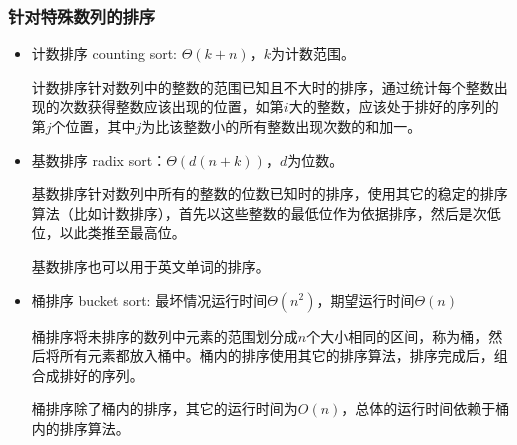 \subsubsection*{针对特殊数列的排序}
\begin{itemize}
    \item 计数排序 counting sort: $\Theta (k+n)$，$k$为计数范围。

    计数排序针对数列中的整数的范围已知且不大时的排序，通过统计每个整数出现的次数获得整数应该出现的位置，如第$i$大的整数，应该处于排好的序列的第$j$个位置，其中$j$为比该整数小的所有整数出现次数的和加一。

    \item 基数排序 radix sort：$\Theta (d(n+k))$，$d$为位数。

    基数排序针对数列中所有的整数的位数已知时的排序，使用其它的稳定的排序算法（比如计数排序），首先以这些整数的最低位作为依据排序，然后是次低位，以此类推至最高位。

    基数排序也可以用于英文单词的排序。

    \item 桶排序 bucket sort: 最坏情况运行时间$\Theta (n^2)$，期望运行时间$\Theta (n)$

    桶排序将未排序的数列中元素的范围划分成$n$个大小相同的区间，称为桶，然后将所有元素都放入桶中。桶内的排序使用其它的排序算法，排序完成后，组合成排好的序列。

    桶排序除了桶内的排序，其它的运行时间为$O(n)$，总体的运行时间依赖于桶内的排序算法。
\end{itemize}